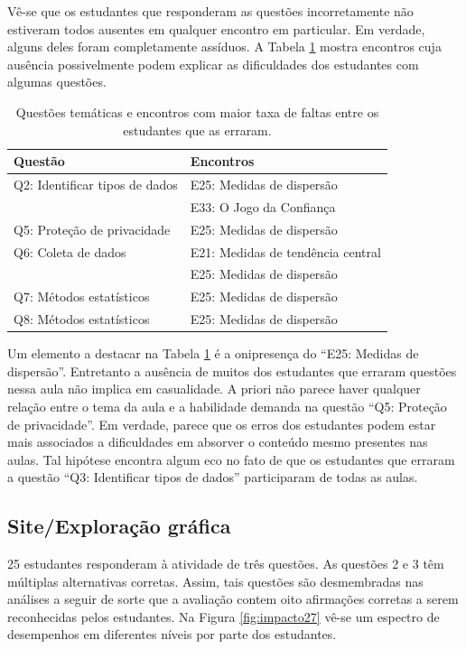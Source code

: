 \documentclass[
]{book}
\begin{document}
Vê-se que os estudantes que responderam as questões incorretamente não
estiveram todos ausentes em qualquer encontro em particular. Em verdade, alguns deles foram completamente assíduos. A Tabela
\ref{tab:quadroimpacto2} mostra encontros cuja ausência possivelmente
podem explicar as dificuldades dos estudantes com algumas questões.

\begin{table}

\caption{\label{tab:quadroimpacto2}Questões temáticas e encontros com maior taxa de faltas entre os estudantes que as erraram.}
\centering
\begin{tabular}[t]{l|l}
\hline
Questão & Encontros\\
\hline
Q2: Identificar tipos de dados & E25: Medidas de dispersão\\
\hline
 & E33: O Jogo da Confiança\\
\hline
Q5: Proteção de privacidade & E25: Medidas de dispersão\\
\hline
Q6: Coleta de dados & E21: Medidas de tendência central\\
\hline
 & E25: Medidas de dispersão\\
\hline
Q7: Métodos estatísticos & E25: Medidas de dispersão\\
\hline
Q8: Métodos estatísticos & E25: Medidas de dispersão\\
\hline
\end{tabular}
\end{table}

Um elemento a destacar na Tabela \ref{tab:quadroimpacto2} é a onipresença do ``E25: Medidas de dispersão''. Entretanto a ausência de muitos dos estudantes que erraram questões nessa aula não implica em casualidade. A priori não parece haver qualquer relação entre o tema da aula e a habilidade demanda na questão ``Q5: Proteção de privacidade''. Em verdade, parece que os erros dos estudantes podem estar mais associados a dificuldades em absorver o conteúdo mesmo presentes nas aulas. Tal hipótese encontra algum eco no fato de que os estudantes que erraram a questão ``Q3: Identificar tipos de dados'' participaram de todas as aulas.

\hypertarget{siteexplorauxe7uxe3o-gruxe1fica}{%
\subsection{Site/Exploração gráfica}\label{siteexplorauxe7uxe3o-gruxe1fica}}

25 estudantes responderam à atividade de três questões. As questões 2 e 3 têm múltiplas alternativas corretas. Assim, tais questões são desmembradas nas análises a seguir de sorte que a avaliação contem oito afirmações corretas a serem reconhecidas pelos estudantes. Na Figura \ref{fig:impacto27} vê-se um espectro de desempenhos em diferentes níveis por parte dos estudantes.
\end{document}
